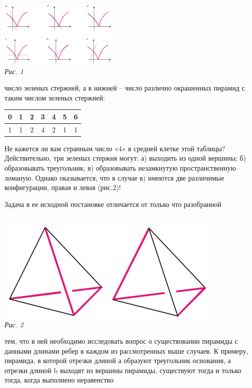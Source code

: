 {\begin{multicols}{3}
\begin{minipage}{\linewidth}
\includegraphics[height=3.2cm]{images/picture1.png} \\
\textsl{Рис. 1} \\
\end{minipage}
число зеленых стержней, а в нижней –
число различно окрашенных пирамид с
таким числом зеленых стержней:
\begin{center}
\begin{tabular}{|c|c|c|c|c|c|c|} 
\hline
0 & 1 & 2 & 3 & 4 & 5 & 6 \\ 
\hline
1 & 1 & 2 & 4 & 2 & 1 & 1 \\
\hline
\end{tabular}
\end{center}
Не кажется ли вам странным число «4» в средней клетке этой таблицы?
Действительно, три зеленых стержня могут: а) выходить из одной вершины;
б) образовывать треугольник; в) образовывать незамкнутую
пространственную ломаную. Однако оказывается, что в случае
в) имеются две различимые конфигурации, правая и левая (рис.2)! \par
Задача в ее исходной постановке отличается от только что разобранной \\ \\
\begin{minipage}{\linewidth}
\includegraphics[width=\linewidth]{images/picture2.png} \\
\textsl{Рис. 2} \\
\end{minipage}
тем, что в ней необходимо исследовать вопрос о существовании
пирамиды с данными длинами ребер в каждом из рассмотренных
выше случаев. К примеру, пирамида, в которой отрезки длиной
$а$ образуют треугольник основания, а отрезки длиной b выходят из
вершины пирамиды, существуют тогда и только тогда, когда
выполнено неравенство\\ 


\end{multicols}}
